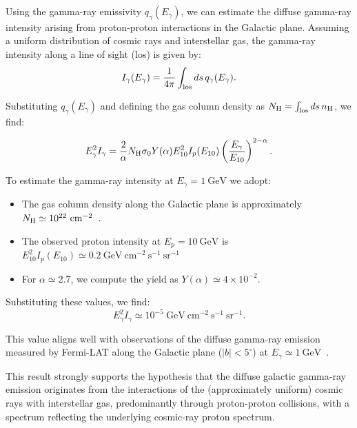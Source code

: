 Using the gamma-ray emissivity \(q_\gamma(E_\gamma)\), we can estimate the diffuse gamma-ray intensity arising from proton-proton interactions in the Galactic plane. Assuming a uniform distribution of cosmic rays and interstellar gas, the gamma-ray intensity along a line of sight (los) is given by:
\begin{equation}
I_\gamma(E_\gamma) = \frac{1}{4\pi} \int_{\rm los} ds \, q_\gamma(E_\gamma).
\end{equation}

Substituting \(q_\gamma(E_\gamma)\) and defining the gas column density as \(N_{\rm H} = \int_{\rm los} ds \, n_{\rm H}\), we find:
\begin{remark}
\begin{equation}
E_\gamma^2 I_\gamma = \frac{2}{\alpha} N_{\rm H} \sigma_0 Y(\alpha) E_{10}^2 I_p(E_{10}) \left(\frac{E_\gamma}{E_{10}}\right)^{2-\alpha}.
\end{equation}
\end{remark}

To estimate the gamma-ray intensity at \(E_\gamma = 1~\text{GeV}\) we adopt:  
%
\begin{itemize}
\item The gas column density along the Galactic plane is approximately \(N_{\rm H} \simeq 10^{22}~\text{cm}^{-2}\)~\cite{addref}.  
\item The observed proton intensity at \(E_p = 10~\text{GeV}\) is \(E_{10}^2 I_p(E_{10}) \simeq 0.2~\text{GeV}~\text{cm}^{-2}~\text{s}^{-1}~\text{sr}^{-1}\)~\cite{crdb} 
\item For \(\alpha \simeq 2.7\), we compute the yield as \(Y(\alpha) \simeq 4 \times 10^{-2}\).
\end{itemize}

Substituting these values, we find:
\begin{equation}
E_\gamma^2 I_\gamma \simeq 10^{-5}~\text{GeV}~\text{cm}^{-2}~\text{s}^{-1}~\text{sr}^{-1}.
\end{equation}

This value aligns well with observations of the diffuse gamma-ray emission measured by Fermi-LAT along the Galactic plane (\(|b| < 5^\circ\)) at \(E_\gamma \simeq 1~\text{GeV}\)~\cite{addref}.  

This result strongly supports the hypothesis that the diffuse galactic gamma-ray emission originates from the interactions of the (approximately uniform) cosmic rays  with interstellar gas, predominantly through proton-proton collisions, with a spectrum reflecting the underlying cosmic-ray proton spectrum.

